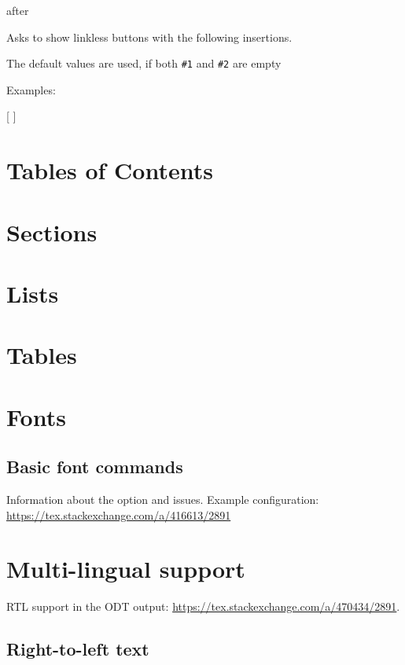 \documentclass{book}
\begin{document}
 {after}\EndDoc

Asks to show linkless buttons with the following insertions.

The default values are used, if both \verb|#1| and \verb|#2| are empty

   Examples:

\begin{texsource}

    {[}
    {] }
\end{texsource}

\section{Tables of Contents}

\section{Sections}
\section{Lists}
\section{Tables}

\section{Fonts}
\subsection{Basic font commands}

Information about the  option and  issues. 
Example configuration:
\url{https://tex.stackexchange.com/a/416613/2891}

\section{Multi-lingual support}

RTL support in the ODT output: \url{https://tex.stackexchange.com/a/470434/2891}.

\subsection{Right-to-left text}
\end{document}

